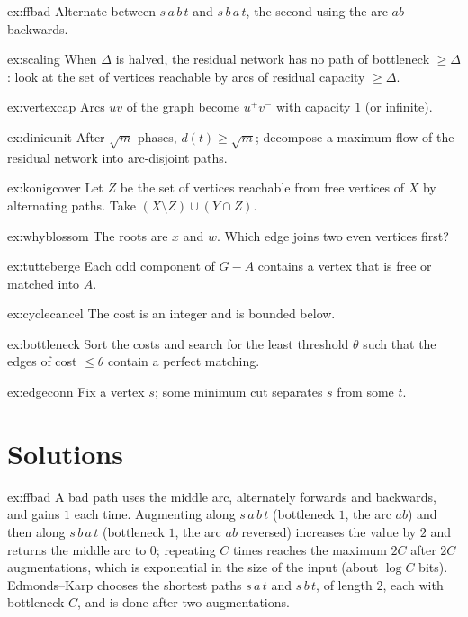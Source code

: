 \begin{hint}{ex:ffbad}
Alternate between $s\,a\,b\,t$ and $s\,b\,a\,t$, the second using the arc $ab$ backwards.
\end{hint}
\begin{hint}{ex:scaling}
When $\Delta$ is halved, the residual network has no path of bottleneck $\ge\Delta$: look at the set of vertices reachable by arcs of residual capacity $\ge\Delta$.
\end{hint}
\begin{hint}{ex:vertexcap}
Arcs $uv$ of the graph become $u^+v^-$ with capacity $1$ (or infinite).
\end{hint}
\begin{hint}{ex:dinicunit}
After $\sqrt m$ phases, $d(t)\ge\sqrt m$; decompose a maximum flow of the residual network into arc-disjoint paths.
\end{hint}
\begin{hint}{ex:konigcover}
Let $Z$ be the set of vertices reachable from free vertices of $X$ by alternating paths. Take $(X\setminus Z)\cup(Y\cap Z)$.
\end{hint}
\begin{hint}{ex:whyblossom}
The roots are $x$ and $w$. Which edge joins two even vertices first?
\end{hint}
\begin{hint}{ex:tutteberge}
Each odd component of $G-A$ contains a vertex that is free or matched into $A$.
\end{hint}
\begin{hint}{ex:cyclecancel}
The cost is an integer and is bounded below.
\end{hint}
\begin{hint}{ex:bottleneck}
Sort the costs and search for the least threshold $\theta$ such that the edges of cost $\le\theta$ contain a perfect matching.
\end{hint}
\begin{hint}{ex:edgeconn}
Fix a vertex $s$; some minimum cut separates $s$ from some $t$.
\end{hint}

\section{Solutions}

\begin{solution}{ex:ffbad}
\idea A bad path uses the middle arc, alternately forwards and backwards, and gains $1$ each time.
\writeup Augmenting along $s\,a\,b\,t$ (bottleneck $1$, the arc $ab$) and then along $s\,b\,a\,t$ (bottleneck $1$, the arc $ab$ reversed) increases the value by $2$ and returns the middle arc to $0$; repeating $C$ times reaches the maximum $2C$ after $2C$ augmentations,
which is exponential in the size of the input (about $\log C$ bits). Edmonds--Karp chooses the shortest paths $s\,a\,t$ and $s\,b\,t$, of length $2$, each with bottleneck $C$, and is done after two augmentations.
\end{solution}

